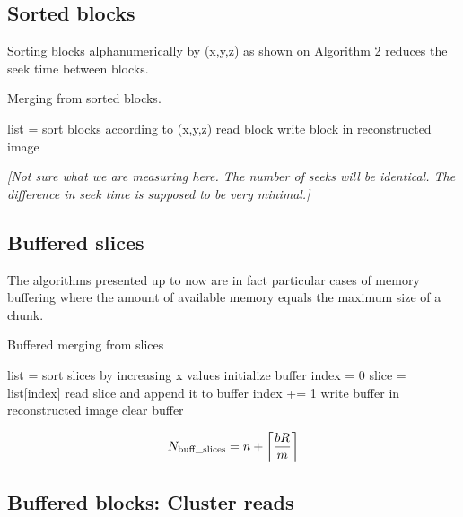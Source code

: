 \documentclass[10pt, conference, compsocconf]{IEEEtran}
\DeclarePairedDelimiter{\ceil}{\lceil}{\rceil}
\newcommand{\todo}[1]{
  \color{red}\emph{[#1]}
  \color{black}
}
\begin{document}
\subsection{Sorted blocks}

Sorting blocks alphanumerically by (x,y,z) as shown on Algorithm 2
reduces the seek time between blocks. 

\begin{algorithm}[h]
  \caption{Merging from sorted blocks.}
  \label{algo:sorted-blocks}
  \begin{algorithmic}
    \STATE list = sort blocks according to (x,y,z)
      \STATE read block
      \STATE write block in reconstructed image
    \ENDFOR
  \end{algorithmic}
  \end{algorithm}

\todo{Not sure what we are measuring here. The number of seeks will be identical. The difference in seek time is supposed to be very minimal.}

\subsection{Buffered slices}

The algorithms presented up to now are in fact particular cases of
memory buffering where the amount of available memory equals the
maximum size of a chunk. 

\begin{algorithm}[h]
  \caption{Buffered merging from slices}
  \label{algo:buffered-slices}
  \begin{algorithmic}
    \STATE list = sort slices by increasing x values
    \STATE initialize buffer
    \STATE index = 0
        \STATE slice = list[index]
        \STATE read slice and append it to buffer
        \STATE index += 1
       \ENDWHILE
       \STATE write buffer in reconstructed image
       \STATE clear buffer
    \ENDWHILE
  \end{algorithmic}
\end{algorithm}

\begin{equation}
N_\mathrm{buff\_slices} =  n + \ceil*{\frac{bR}{m}}
\end{equation}


\subsection{Buffered blocks: Cluster reads}
\end{document}
